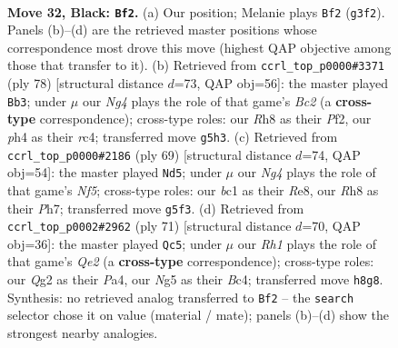 \documentclass[11pt]{article}
\begin{document}
\clearpage

\begin{figure}[p]\centering
\begin{subfigure}{0.46\textwidth}\centering
\resizebox{\linewidth}{!}{%
\newchessgame
\chessboard[
  setfen={r6r/4k2p/1pp1p1p1/6n1/1p1P3P/PP1KP1b1/R5q1/2BQ4 b - - 2 32},
  showmover=false,
  pgfstyle=straightmove, color=movearrow, markmove={g3-f2}
]}
\caption{}
\end{subfigure}\hfill
\begin{subfigure}{0.46\textwidth}\centering
\resizebox{\linewidth}{!}{%
\newchessgame
\chessboard[
  setfen={6qk/Q4p2/1p2b1pp/2p4P/2r5/P5R1/1PB2PP1/6K1 w - - 0 40},
  showmover=false,
  pgfstyle=straightmove, color=movearrow, markmove={c2-b3}
]}
\caption{}
\end{subfigure}
\\[4pt]
\begin{subfigure}{0.46\textwidth}\centering
\resizebox{\linewidth}{!}{%
\newchessgame
\chessboard[
  setfen={4r1k1/7p/1p2p1p1/5p2/pPqP1n1P/P1B2Q2/5PP1/4R1K1 b - - 0 35},
  showmover=false,
  pgfstyle=straightmove, color=movearrow, markmove={f4-d5}
]}
\caption{}
\end{subfigure}\hfill
\begin{subfigure}{0.46\textwidth}\centering
\resizebox{\linewidth}{!}{%
\newchessgame
\chessboard[
  setfen={3r2k1/4qpp1/7p/1p1P4/p1bR3P/P1P3P1/5PB1/2Q3K1 b - - 5 36},
  showmover=false,
  pgfstyle=straightmove, color=movearrow, markmove={e7-c5}
]}
\caption{}
\end{subfigure}
\caption{\textbf{Move 32, Black: \texttt{Bf2}.} (a) Our position; Melanie plays \texttt{Bf2} (\texttt{g3f2}). Panels (b)--(d) are the retrieved master positions whose correspondence most drove this move (highest QAP objective among those that transfer to it). (b) Retrieved from \texttt{ccrl\_top\_p0000\#3371} (ply 78) [structural distance $d$=73, QAP obj=56]: the master played \texttt{Bb3}; under $\mu$ our \emph{Ng4} plays the role of that game's \emph{Bc2} (a \textbf{cross-type} correspondence); cross-type roles: our \emph{R}h8 as their \emph{P}f2, our \emph{p}h4 as their \emph{r}c4; transferred move \texttt{g5h3}. (c) Retrieved from \texttt{ccrl\_top\_p0000\#2186} (ply 69) [structural distance $d$=74, QAP obj=54]: the master played \texttt{Nd5}; under $\mu$ our \emph{Ng4} plays the role of that game's \emph{Nf5}; cross-type roles: our \emph{b}c1 as their \emph{R}e8, our \emph{R}h8 as their \emph{P}h7; transferred move \texttt{g5f3}. (d) Retrieved from \texttt{ccrl\_top\_p0002\#2962} (ply 71) [structural distance $d$=70, QAP obj=36]: the master played \texttt{Qc5}; under $\mu$ our \emph{Rh1} plays the role of that game's \emph{Qe2} (a \textbf{cross-type} correspondence); cross-type roles: our \emph{Q}g2 as their \emph{P}a4, our \emph{N}g5 as their \emph{B}c4; transferred move \texttt{h8g8}. Synthesis: no retrieved analog transferred to \texttt{Bf2} -- the \texttt{search} selector chose it on value (material / mate); panels (b)--(d) show the strongest nearby analogies.}
\label{fig:thought-m63}
\end{figure}
\end{document}
